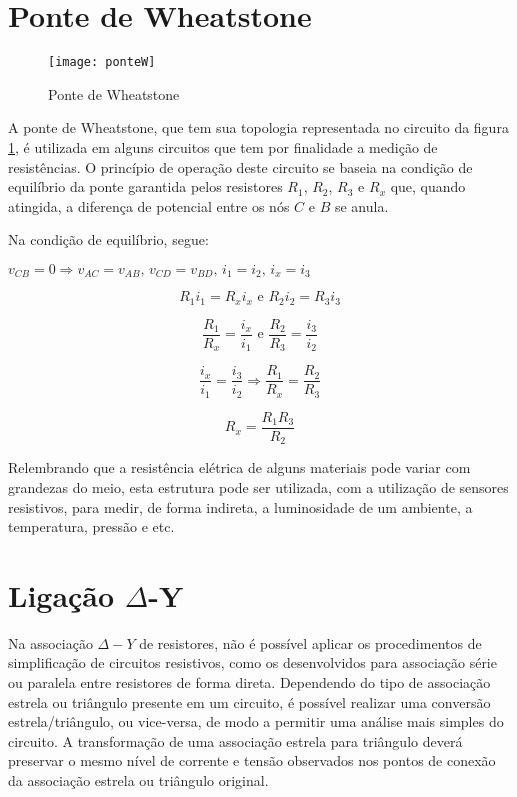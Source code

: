 \documentclass[12pt,fleqn]{book} %
\begin{document}
\section{Ponte de Wheatstone}
       \begin{figure}[!htbp] \centering\texttt{[image: ponteW]}
            \caption{Ponte de Wheatstone}\label{ponteW} 
        \end{figure}

A ponte de Wheatstone, que tem sua topologia representada no circuito da figura \ref{ponteW}, é utilizada em alguns circuitos que tem por finalidade a medição de resistências. O princípio de operação deste circuito se baseia na condição de equilíbrio da ponte garantida pelos resistores $R_1$, $R_2$, $R_3$ e $R_x$ que, quando atingida, a diferença de potencial entre os nós $C$ e $B$ se anula.

Na condição de equilíbrio, segue:

$v_{CB} = 0 \Rightarrow v_{AC} = v_{AB} \text{, } v_{CD} = v_{BD} \text{, } i_1 = i_2 \text{, } i_x = i_3$

\begin{equation}
R_1i_1 = R_xi_x \text{ e }R_2i_2 = R_3i_3 
\end{equation}

\begin{equation}
\frac{R_1}{R_x} = \frac{i_x}{i_1} \text{ e } \frac{R_2}{R_3} = \frac{i_3}{i_2}
\end{equation}

\begin{equation}
\frac{i_x}{i_1} = \frac{i_3}{i_2} \Rightarrow \frac{R_1}{R_x} = \frac{R_2}{R_3}
\end{equation}

\begin{equation}
R_x = \frac{R_1R_3}{R_2}
\end{equation}

Relembrando que a resistência elétrica de alguns materiais pode variar com grandezas do meio, esta estrutura pode ser utilizada, com a utilização de sensores resistivos, para medir, de forma indireta, a luminosidade de um ambiente, a temperatura, pressão e etc. 

\section{Ligação $\Delta $-Y}

Na associação $\Delta - Y$ de resistores, não é possível aplicar os procedimentos de simplificação de circuitos resistivos, como os desenvolvidos para associação série ou paralela entre resistores de forma direta. Dependendo do tipo de associação estrela ou triângulo presente em um circuito, é possível realizar uma conversão estrela/triângulo, ou vice-versa, de modo a permitir uma análise mais simples do circuito. A transformação de uma associação estrela para triângulo deverá preservar o mesmo nível de corrente e tensão observados nos pontos de conexão da associação estrela ou triângulo original.
\end{document}

